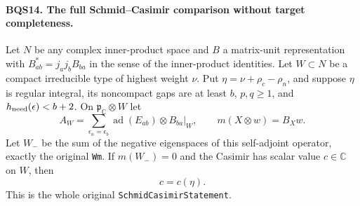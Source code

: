 \paragraph{BQS14. The full Schmid--Casimir comparison without target completeness.}
\label{claim:BQS14}
Let $N$ be any complex inner-product space and $B$ a matrix-unit
representation with
$B_{ab}^*=j_aj_bB_{ba}$ in the sense of the inner-product identities.
Let $W\subset N$ be a compact irreducible type of highest weight $\nu$.
Put
$\eta=\nu+\rho_c-\rho_n$, and suppose $\eta$ is regular integral,
its noncompact gaps are at least $b$, $p,q\ge1$, and
$h_{\rm need}(\epsilon)<b+2$.
On $\mathfrak p_{\mathbb C}\otimes W$ let
\[
 A_W=\sum_{\epsilon_a=\epsilon_b}
           \operatorname{ad}(E_{ab})\otimes B_{ba}|_W,\qquad
 m(X\otimes w)=B_Xw.
 \tag{BQS.35}
\]
Let $W_-$ be the sum of the negative eigenspaces of this self-adjoint
operator, exactly the original \texttt{Wm}.
If $m(W_-)=0$ and the Casimir has scalar value $c\in\mathbb C$
on $W$, then
\[
                               c=c(\eta).
 \tag{BQS.36}
\]
This is the whole original \texttt{SchmidCasimirStatement}.

